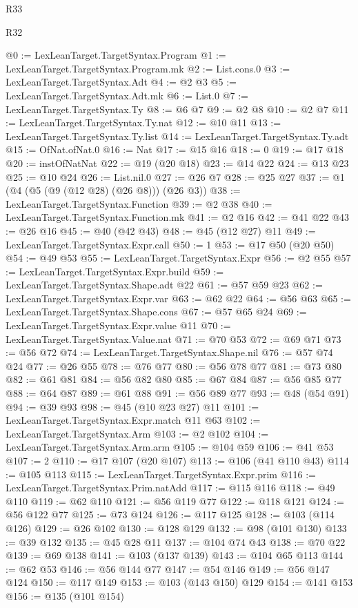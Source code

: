 \begin{lexlean}{R33}
\begin{lexlean}{R32}
\begin{coremodule}
{{{{{{{{{{{{{{{{@0 := LexLeanTarget.TargetSyntax.Program
@1 := LexLeanTarget.TargetSyntax.Program.mk
@2 := List.cons.{0}
@3 := LexLeanTarget.TargetSyntax.Adt
@4 := @2 @3
@5 := LexLeanTarget.TargetSyntax.Adt.mk
@6 := List.{0}
@7 := LexLeanTarget.TargetSyntax.Ty
@8 := @6 @7
@9 := @2 @8
@10 := @2 @7
@11 := LexLeanTarget.TargetSyntax.Ty.nat
@12 := @10 @11
@13 := LexLeanTarget.TargetSyntax.Ty.list
@14 := LexLeanTarget.TargetSyntax.Ty.adt
@15 := OfNat.ofNat.{0}
@16 := Nat
@17 := @15 @16
@18 := 0
@19 := @17 @18
@20 := instOfNatNat
@22 := @19 (@20 @18)
@23 := @14 @22
@24 := @13 @23
@25 := @10 @24
@26 := List.nil.{0}
@27 := @26 @7
@28 := @25 @27
@37 := @1 (@4 (@5 (@9 (@12 @28) (@26 @8))) (@26 @3))
@38 := LexLeanTarget.TargetSyntax.Function
@39 := @2 @38
@40 := LexLeanTarget.TargetSyntax.Function.mk
@41 := @2 @16
@42 := @41 @22
@43 := @26 @16
@45 := @40 (@42 @43)
@48 := @45 (@12 @27) @11
@49 := LexLeanTarget.TargetSyntax.Expr.call
@50 := 1
@53 := @17 @50 (@20 @50)
@54 := @49 @53
@55 := LexLeanTarget.TargetSyntax.Expr
@56 := @2 @55
@57 := LexLeanTarget.TargetSyntax.Expr.build
@59 := LexLeanTarget.TargetSyntax.Shape.adt @22
@61 := @57 @59 @23
@62 := LexLeanTarget.TargetSyntax.Expr.var
@63 := @62 @22
@64 := @56 @63
@65 := LexLeanTarget.TargetSyntax.Shape.cons
@67 := @57 @65 @24
@69 := LexLeanTarget.TargetSyntax.Expr.value @11
@70 := LexLeanTarget.TargetSyntax.Value.nat
@71 := @70 @53
@72 := @69 @71
@73 := @56 @72
@74 := LexLeanTarget.TargetSyntax.Shape.nil
@76 := @57 @74 @24
@77 := @26 @55
@78 := @76 @77
@80 := @56 @78 @77
@81 := @73 @80
@82 := @61 @81
@84 := @56 @82 @80
@85 := @67 @84
@87 := @56 @85 @77
@88 := @64 @87
@89 := @61 @88
@91 := @56 @89 @77
@93 := @48 (@54 @91)
@94 := @39 @93
@98 := @45 (@10 @23 @27) @11
@101 := LexLeanTarget.TargetSyntax.Expr.match @11 @63
@102 := LexLeanTarget.TargetSyntax.Arm
@103 := @2 @102
@104 := LexLeanTarget.TargetSyntax.Arm.arm
@105 := @104 @59
@106 := @41 @53
@107 := 2
@110 := @17 @107 (@20 @107)
@113 := @106 (@41 @110 @43)
@114 := @105 @113
@115 := LexLeanTarget.TargetSyntax.Expr.prim
@116 := LexLeanTarget.TargetSyntax.Prim.natAdd
@117 := @115 @116
@118 := @49 @110
@119 := @62 @110
@121 := @56 @119 @77
@122 := @118 @121
@124 := @56 @122 @77
@125 := @73 @124
@126 := @117 @125
@128 := @103 (@114 @126)
@129 := @26 @102
@130 := @128 @129
@132 := @98 (@101 @130)
@133 := @39 @132
@135 := @45 @28 @11
@137 := @104 @74 @43
@138 := @70 @22
@139 := @69 @138
@141 := @103 (@137 @139)
@143 := @104 @65 @113
@144 := @62 @53
@146 := @56 @144 @77
@147 := @54 @146
@149 := @56 @147 @124
@150 := @117 @149
@153 := @103 (@143 @150) @129
@154 := @141 @153
@156 := @135 (@101 @154)
}}}}}}}}}}}}}}}}
\end{coremodule}
\end{lexlean}
\end{lexlean}
